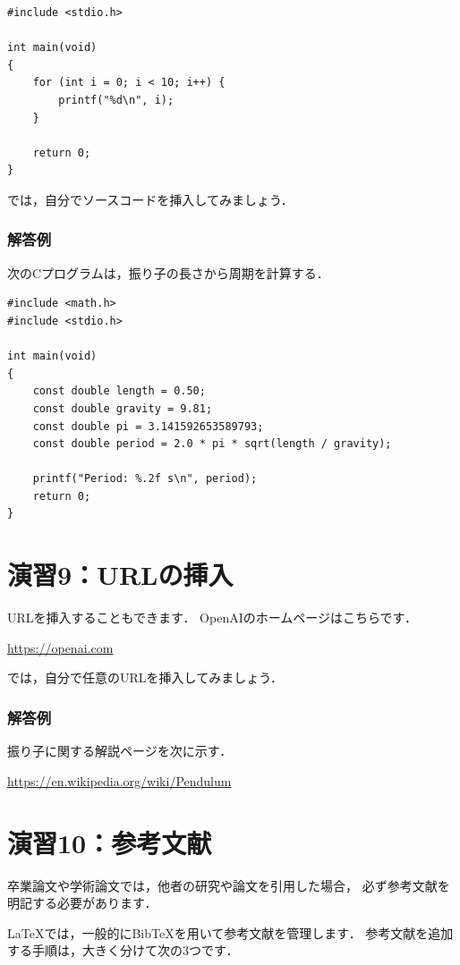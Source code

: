 \documentclass[a4paper,twocolumn]{ltjsarticle}
\begin{document}
\begin{lstlisting}
#include <stdio.h>

int main(void)
{
    for (int i = 0; i < 10; i++) {
        printf("%d\n", i);
    }

    return 0;
}
\end{lstlisting}

では，自分でソースコードを挿入してみましょう．


\subsubsection*{解答例}
次のCプログラムは，振り子の長さから周期を計算する．
\begin{lstlisting}
#include <math.h>
#include <stdio.h>

int main(void)
{
    const double length = 0.50;
    const double gravity = 9.81;
    const double pi = 3.141592653589793;
    const double period = 2.0 * pi * sqrt(length / gravity);

    printf("Period: %.2f s\n", period);
    return 0;
}
\end{lstlisting}

\section*{演習9：URLの挿入}
URLを挿入することもできます．
OpenAIのホームページはこちらです．

\url{https://openai.com}

では，自分で任意のURLを挿入してみましょう．


\subsubsection*{解答例}
振り子に関する解説ページを次に示す．

\url{https://en.wikipedia.org/wiki/Pendulum}

\section*{演習10：参考文献}
卒業論文や学術論文では，他者の研究や論文を引用した場合，
必ず参考文献を明記する必要があります．

LaTeXでは，一般的にBibTeXを用いて参考文献を管理します．
参考文献を追加する手順は，大きく分けて次の3つです．
\end{document}
